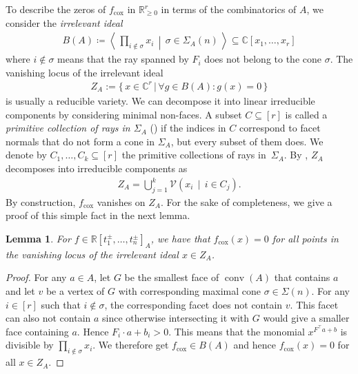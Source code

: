 \documentclass[a4paper,11pt]{amsart}
\newtheorem{lemma}[theorem]{Lemma}
\theoremstyle{definition}
\DeclareMathOperator{\conv}{conv}
\newcommand{\RR}{\mathbb{R}}
\newcommand{\CC}{\mathbb{C}}
\newcommand{\cox}{\mathrm{cox}}
\begin{document}
To describe the zeros of $f_\cox$ in $\mathbb{R}^r_{\geq0}$ in terms of the combinatorics of $A$, we consider the \emph{irrelevant ideal} 
\begin{align*}
    B(A) \coloneqq\left\langle \, \prod_{i\notin \sigma}x_i \,\middle|\,\sigma \in \Sigma_A(n)\,\right\rangle     \subseteq \CC[x_1, \dots , x_r]
\end{align*}
where $i\notin \sigma$ means that the ray spanned by $F_i$ does not belong to the cone $\sigma$. 
The vanishing locus of the irrelevant ideal
\begin{align*}
    Z_A:=\{\,x\in \CC^r\,|\,\forall g\in B(A)\colon g(x)=0\,\}
\end{align*}
is usually a reducible variety. 
We can decompose it into linear irreducible components by considering minimal non-faces.
A subset $C \subseteq [r]$ is called a \emph{primitive collection of rays in $\Sigma_A$} (\cite[Definition 5.1.5]{CoxLittleSchenck}) if 
the indices in $C$ correspond to facet normals that do not form a cone in $\Sigma_A$, but every subset of them does.
We denote by $C_1,\ldots,C_k \subseteq [r]$ the primitive collections of rays in~$\Sigma_A$.
By \cite[Proposition 5.1.6]{CoxLittleSchenck}, $Z_A$ decomposes into irreducible components as
\begin{align}
\label{eq:decompositionIrrelevantLocus}
    Z_A=\bigcup_{j=1}^k\mathcal{V}(x_i\, \mid \, i\in C_j).
\end{align}
By construction, $f_\cox$ vanishes on $Z_A$. For the sake of completeness, we give a proof of this simple fact in the next lemma.
\begin{lemma}
\label{Lemma:VanishingOnIrrelevant}
For $f \in \RR[t_1^\pm , \dots, t_n^\pm]_A$, we have that $f_\cox(x)=0$ for all points in the vanishing locus of the irrelevant ideal $x \in Z_A$. 
\end{lemma}

\begin{proof}
     For any $a\in A$, let $G$ be the smallest face of $\conv(A)$ that contains $a$ and let $v$ be a vertex of $G$ with corresponding maximal cone $\sigma \in \Sigma(n)$.
     For any $i \in [r]$ such that $i\notin \sigma$, the corresponding facet does not contain $v$.
     This facet can also not contain $a$ since otherwise intersecting it with $G$ would give a smaller face containing $a$. Hence $F_i \cdot a+b_{i}>0$. This means that the monomial $x^{F^\top a+b}$ is divisible by $\prod_{i\notin \sigma}x_i$. We therefore get $f_\cox\in B(A)$ and hence $f_\cox(x)=0$ for all $x \in Z_A$. 
\end{proof}
\end{document}
